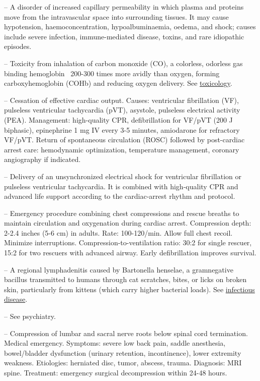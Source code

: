 -- A disorder of increased capillary permeability in which plasma and proteins move from the intravascular space into surrounding tissues. It may cause hypotension, haemoconcentration, hypoalbuminaemia, oedema, and shock; causes include severe infection, immune-mediated disease, toxins, and rare idiopathic episodes.

-- Toxicity from inhalation of carbon monoxide (CO), a colorless, odorless gas binding hemoglobin ~200-300 times more avidly than oxygen, forming carboxyhemoglobin (COHb) and reducing oxygen delivery. See \hyperlink{Toxicology}{toxicology}.

-- Cessation of effective cardiac output. Causes: ventricular fibrillation (VF), pulseless ventricular tachycardia (pVT), asystole, pulseless electrical activity (PEA). Management: high-quality CPR, defibrillation for VF/pVT (200 J biphasic), epinephrine 1 mg IV every 3-5 minutes, amiodarone for refractory VF/pVT. Return of spontaneous circulation (ROSC) followed by post-cardiac arrest care: hemodynamic optimization, temperature management, coronary angiography if indicated.

-- Delivery of an unsynchronized electrical shock for ventricular fibrillation or pulseless ventricular tachycardia. It is combined with high-quality CPR and advanced life support according to the cardiac-arrest rhythm and protocol.

-- Emergency procedure combining chest compressions and rescue breaths to maintain circulation and oxygenation during cardiac arrest. Compression depth: 2-2.4 inches (5-6 cm) in adults. Rate: 100-120/min. Allow full chest recoil. Minimize interruptions. Compression-to-ventilation ratio: 30:2 for single rescuer, 15:2 for two rescuers with advanced airway. Early defibrillation improves survival.

-- A regional lymphadenitis caused by Bartonella henselae, a gramnegative bacillus transmitted to humans through cat scratches, bites, or licks on broken skin, particularly from kittens (which carry higher bacterial loads). See \hyperlink{Infectious Disease}{infectious disease}.

-- See psychiatry.

-- Compression of lumbar and sacral nerve roots below spinal cord termination. Medical emergency. Symptoms: severe low back pain, saddle anesthesia, bowel/bladder dysfunction (urinary retention, incontinence), lower extremity weakness. Etiologies: herniated disc, tumor, abscess, trauma. Diagnosis: MRI spine. Treatment: emergency surgical decompression within 24-48 hours.

